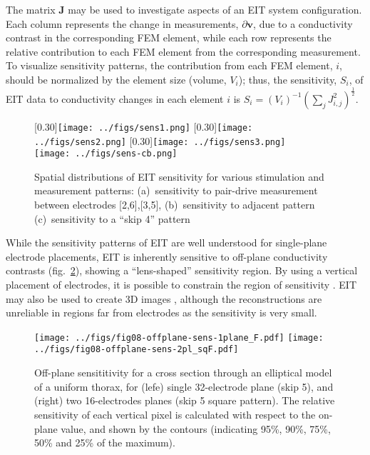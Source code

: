\documentclass[12pt]{article} \usepackage[margin=3cm]{geometry} \usepackage[margin=20pt,font=small,labelfont=bf]{caption}\def\TBLWIDA{35mm}\def\TBLWIDB{95mm}
\newcommand\fref[1]{fig.\ \ref{#1}}
\newcommand{\vB}{\mathbf{v}}
\newcommand{\JB}{\mathbf{J}}
\begin{document}
The matrix $\JB$ may be used to investigate
aspects of an EIT system configuration. Each column
represents the change in measurements, $\partial \vB$, due to
a conductivity contrast in the corresponding FEM element, while
each row represents the relative contribution to each FEM element
from the corresponding measurement. To visualize sensitivity patterns,
the contribution from each FEM element, $i$, should be normalized by the
element size (volume, $V_i$); thus, the sensitivity, $S_i$, of EIT data to 
conductivity changes in each element $i$ is
$ S_i = (V_i)^{-1} (\sum_j J_{i,j}^2 )^{\frac{1}{2}}$.

\begin{figure} \centering
   [0.30\columnwidth]{\texttt{[image: ../figs/sens1.png]}}\hfil%
   [0.30\columnwidth]{\texttt{[image: ../figs/sens2.png]}}\hfil%
   [0.30\columnwidth]{\texttt{[image: ../figs/sens3.png]}}\\
   \centering \texttt{[image: ../figs/sens-cb.png]}\\
\caption{%
Spatial distributions of EIT sensitivity for various
stimulation and measurement patterns:
(a)~sensitivity to pair-drive measurement between electrodes [2,6],[3,5],
(b)~sensitivity to adjacent pattern
(c)~sensitivity to a ``skip 4'' pattern
}
\label{fig:sensitivity_patterns}
\end{figure}

While the sensitivity patterns of EIT are well understood for 
single-plane electrode placements, EIT is inherently sensitive
to off-plane conductivity contrasts (\fref{fig:off_plane_sensitivity}),
showing a ``lens-shaped'' sensitivity region.
By using a vertical placement of electrodes, it is possible to
constrain the region of sensitivity \cite{Grychtol20163DEIT}.
EIT may also be used to create 3D images \cite{Metherall1996Three},
although the reconstructions are unreliable in regions far from electrodes
as the sensitivity is very small.

\begin{figure} \centering
   \texttt{[image: ../figs/fig08-offplane-sens-1plane\_F.pdf]}
   \texttt{[image: ../figs/fig08-offplane-sens-2pl\_sqF.pdf]}
\caption{%
Off-plane sensititivity for a cross section through an elliptical
model of a uniform thorax, for 
(lefe)  single 32-electrode plane (skip 5), and
(right) two 16-electrodes planes  (skip 5 square pattern).
The relative sensitivity of each vertical
pixel is calculated with respect to the on-plane value, and shown by
the contours (indicating 95\%, 90\%, 75\%, 50\% and 25\% of the maximum).
}
\label{fig:off_plane_sensitivity}
\end{figure}
\end{document}

